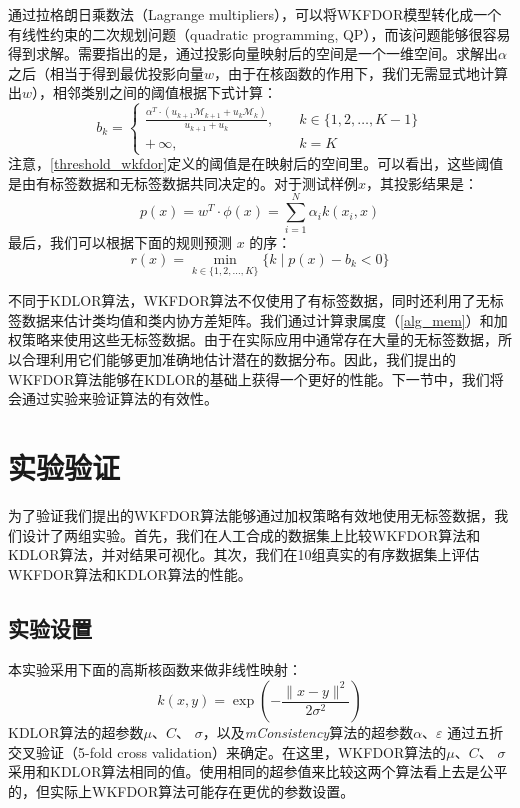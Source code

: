 通过拉格朗日乘数法（Lagrange multipliers），可以将WKFDOR模型转化成一个有线性约束的二次规划问题（quadratic programming, QP），而该问题能够很容易得到求解。需要指出的是，通过投影向量映射后的空间是一个一维空间。求解出\(\alpha\)之后（相当于得到最优投影向量\(w\)，由于在核函数的作用下，我们无需显式地计算出\(w\)），相邻类别之间的阈值根据下式计算：
\begin{equation}
\label{threshold_wkfdor}
b_{k}=\begin{cases}
\frac{\alpha^{T} \cdot (u_{k+1} \mathcal{M}_{k+1} + u_{k} \mathcal{M}_{k})}{u_{k+1}+u_{k}},\quad &k \in \{1,2,\dots,K-1\} \\
+\,\infty,\quad &k=K
\end{cases}
\end{equation}
注意，\autoref{threshold_wkfdor}定义的阈值是在映射后的空间里。可以看出，这些阈值是由有标签数据和无标签数据共同决定的。对于测试样例\(x\)，其投影结果是：
\begin{equation}
\label{projResult_wkfdor}
p(x)=w^{T} \cdot \phi(x)=\sum_{i=1}^{N} \alpha_{i} k(x_{i},x)
\end{equation}
最后，我们可以根据下面的规则预测 \(x\) 的序：
\begin{equation}
\label{rank_rule_wkfdor}
r(x)=\min \limits_{k \in \{1,2,\dots,K\}} \{k\mid p(x)-b_{k}<0\}
\end{equation}

不同于KDLOR算法，WKFDOR算法不仅使用了有标签数据，同时还利用了无标签数据来估计类均值和类内协方差矩阵。我们通过计算隶属度（\autoref{alg_mem}）和加权策略来使用这些无标签数据。由于在实际应用中通常存在大量的无标签数据，所以合理利用它们能够更加准确地估计潜在的数据分布。因此，我们提出的WKFDOR算法能够在KDLOR的基础上获得一个更好的性能。下一节中，我们将会通过实验来验证算法的有效性。

\section{实验验证}
为了验证我们提出的WKFDOR算法能够通过加权策略有效地使用无标签数据，我们设计了两组实验。首先，我们在人工合成的数据集上比较WKFDOR算法和KDLOR算法，并对结果可视化。其次，我们在10组真实的有序数据集上评估WKFDOR算法和KDLOR算法的性能。

\subsection{实验设置}
\label{wkfdor_expSet}
本实验采用下面的高斯核函数来做非线性映射：
\begin{equation}
\label{Gaussian_kernel}
k(x,y)=\exp(-\frac{\parallel x-y \parallel^{2}}{2\sigma^{2}})
\end{equation}
KDLOR算法的超参数\(\mu\)、\(C\)、 \(\sigma\)，以及\textit{mConsistency}算法的超参数\(\alpha\)、\(\varepsilon\) 通过五折交叉验证（5-fold cross validation）来确定。在这里，WKFDOR算法的\(\mu\)、\(C\)、 \(\sigma\)采用和KDLOR算法相同的值。使用相同的超参值来比较这两个算法看上去是公平的，但实际上WKFDOR算法可能存在更优的参数设置。


